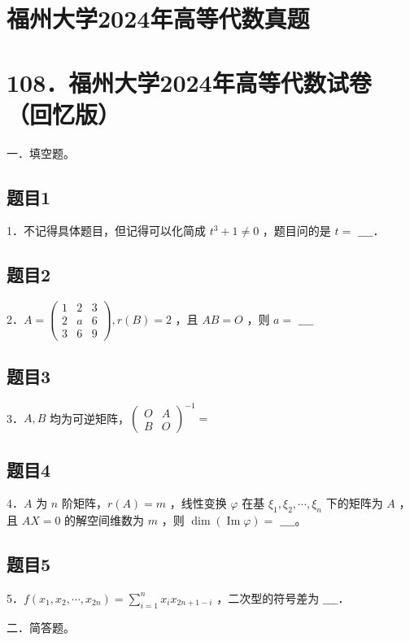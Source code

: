 \documentclass{article}
\begin{document}
\section*{福州大学2024年高等代数真题}
\section*{108．福州大学2024年高等代数试卷（回忆版）}
一．填空题。\\

\subsection{题目1}
1．不记得具体题目，但记得可以化简成 \(t^{3}+1 \neq 0\) ，题目问的是 \(t=\) \(\_\_\_\_\)．

\subsection{题目2}
2．\(A=\left(\begin{array}{lll}1 & 2 & 3 \\ 2 & a & 6 \\ 3 & 6 & 9\end{array}\right), r(B)=2\) ，且 \(A B=O\) ，则 \(a=\) \(\_\_\_\_\)

\subsection{题目3}
3．\(A, B\) 均为可逆矩阵，\(\left(\begin{array}{cc}O & A \\ B & O\end{array}\right)^{-1}=\)

\subsection{题目4}
4．\(A\) 为 \(n\) 阶矩阵，\(r(A)=m\) ，线性变换 \(\varphi\) 在基 \(\xi_{1}, \xi_{2}, \cdots, \xi_{n}\) 下的矩阵为 \(A\) ，且 \(A X=0\) 的解空间维数为 \(m\) ，则 \(\operatorname{dim}(\operatorname{Im} \varphi)=\) \(\_\_\_\_\)。

\subsection{题目5}
5．\(f\left(x_{1}, x_{2}, \cdots, x_{2 n}\right)=\sum_{i=1}^{n} x_{i} x_{2 n+1-i}\) ，二次型的符号差为 \(\_\_\_\_\)．

二．简答题。\\
\end{document}
